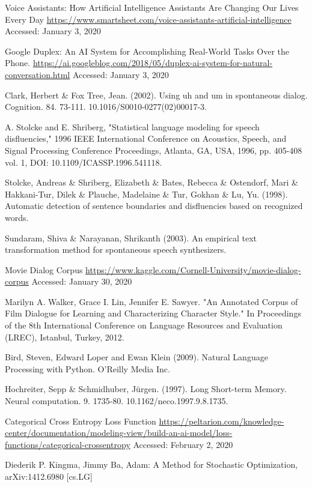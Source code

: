 \documentclass[journal]{IEEEtran}
\begin{document}
\begin{thebibliography}{99}
 Voice Assistants: How Artificial Intelligence Assistants Are Changing Our Lives Every Day
\url{https://www.smartsheet.com/voice-assistants-artificial-intelligence} Accessed: January 3, 2020

 Google Duplex: An AI System for Accomplishing Real-World Tasks Over the Phone. \url{https://ai.googleblog.com/2018/05/duplex-ai-system-for-natural-conversation.html} Accessed: January 3, 2020

 Clark, Herbert \& Fox Tree, Jean. (2002). Using uh and um in spontaneous dialog. Cognition. 84. 73-111. 10.1016/S0010-0277(02)00017-3.

 A. Stolcke and E. Shriberg, "Statistical language modeling for speech disfluencies," 1996 IEEE International Conference on Acoustics, Speech, and Signal Processing Conference Proceedings, Atlanta, GA, USA, 1996, pp. 405-408 vol. 1, DOI: 10.1109/ICASSP.1996.541118.

 Stolcke, Andreas \& Shriberg, Elizabeth \& Bates, Rebecca \& Ostendorf, Mari \& Hakkani-Tur, Dilek \& Plauche, Madelaine \& Tur, Gokhan \& Lu, Yu. (1998). Automatic detection of sentence boundaries and disfluencies based on recognized words. 

 Sundaram, Shiva \& Narayanan, Shrikanth (2003). An empirical text transformation method for spontaneous speech synthesizers.

 Movie Dialog Corpus \url{https://www.kaggle.com/Cornell-University/movie-dialog-corpus} Accessed: January 30, 2020

 Marilyn A. Walker, Grace I. Lin, Jennifer E. Sawyer. "An Annotated Corpus of Film Dialogue for Learning and Characterizing Character Style." In Proceedings of the 8th International Conference on Language Resources and Evaluation (LREC), Istanbul, Turkey, 2012.

 Bird, Steven, Edward Loper and Ewan Klein (2009). Natural Language Processing with Python. O’Reilly Media Inc.

 Hochreiter, Sepp \& Schmidhuber, Jürgen. (1997). Long Short-term Memory. Neural computation. 9. 1735-80. 10.1162/neco.1997.9.8.1735. 

 Categorical Cross Entropy Loss Function
\url{https://peltarion.com/knowledge-center/documentation/modeling-view/build-an-ai-model/loss-functions/categorical-crossentropy}
Accessed: February 2, 2020

	Diederik P. Kingma, Jimmy Ba, Adam: A Method for Stochastic Optimization, arXiv:1412.6980 [cs.LG]

\end{thebibliography}
\end{document}

